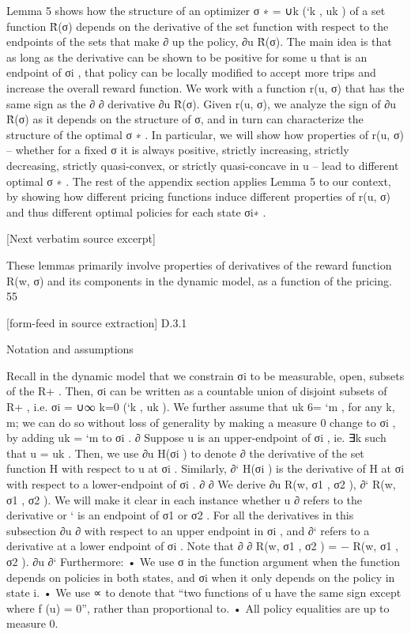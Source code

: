 \documentclass[10pt]{article}
\begin{document}
\begin{ReviewVerbatim}
Lemma 5 shows how the structure of an optimizer σ ∗ = ∪k (`k , uk ) of a set function R̂(σ)
depends on the derivative of the set function with respect to the endpoints of the sets that make
∂
up the policy, ∂u
R̂(σ). The main idea is that as long as the derivative can be shown to be positive
for some u that is an endpoint of σi , that policy can be locally modified to accept more trips and
increase the overall reward function. We work with a function r(u, σ) that has the same sign as the
∂
∂
derivative ∂u
R̂(σ). Given r(u, σ), we analyze the sign of ∂u
R̂(σ) as it depends on the structure of
σ, and in turn can characterize the structure of the optimal σ ∗ .
In particular, we will show how properties of r(u, σ) – whether for a fixed σ it is always positive,
strictly increasing, strictly decreasing, strictly quasi-convex, or strictly quasi-concave in u – lead to
different optimal σ ∗ . The rest of the appendix section applies Lemma 5 to our context, by showing
how different pricing functions induce different properties of r(u, σ) and thus different optimal
policies for each state σi∗ .

[Next verbatim source excerpt]

These lemmas primarily involve properties of derivatives of the reward function R(w, σ) and its
components in the dynamic model, as a function of the pricing.
55


[form-feed in source extraction]
D.3.1

Notation and assumptions

Recall in the dynamic model that we constrain σi to be measurable, open, subsets of the R+ . Then,
σi can be written as a countable union of disjoint subsets of R+ , i.e. σi = ∪∞
k=0 (`k , uk ). We further
assume that uk 6= `m , for any k, m; we can do so without loss of generality by making a measure 0
change to σi , by adding uk = `m to σi .
∂
Suppose u is an upper-endpoint of σi , ie. ∃k such that u = uk . Then, we use ∂u
H(σi ) to denote
∂
the derivative of the set function H with respect to u at σi . Similarly, ∂` H(σi ) is the derivative of
H at σi with respect to a lower-endpoint of σi .
∂
∂
We derive ∂u
R(w, {σ1 , σ2 }), ∂`
R(w, {σ1 , σ2 }). We will make it clear in each instance whether u
∂
refers to the derivative
or ` is an endpoint of σ1 or σ2 . For all the derivatives in this subsection ∂u
∂
with respect to an upper endpoint in σi , and ∂` refers to a derivative at a lower endpoint of σi .
Note that
∂
∂
R(w, {σ1 , σ2 }) = − R(w, {σ1 , σ2 }).
∂u
∂`
Furthermore:
• We use σ in the function argument when the function depends on policies in both states, and
σi when it only depends on the policy in state i.
• We use ∝ to denote that “two functions of u have the same sign except where f (u) = 0”,
rather than proportional to.
• All policy equalities are up to measure 0.
\end{ReviewVerbatim}
\end{document}
